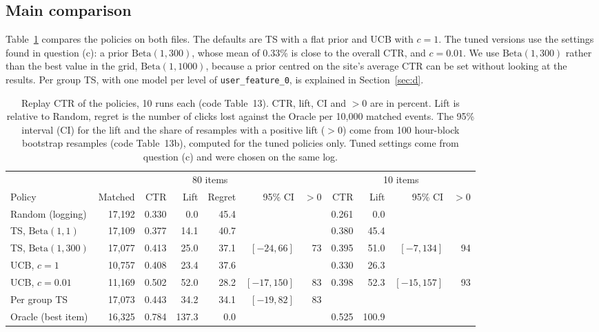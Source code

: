 \documentclass[11pt]{article}
\begin{document}
\subsection{Main comparison}

Table~\ref{tab:a} compares the policies on both files. The defaults are TS
with a flat prior and UCB with $c=1$. The tuned versions use the settings
found in question (c): a prior $\text{Beta}(1,300)$, whose mean of 0.33\% is
close to the overall CTR, and $c=0.01$. We use $\text{Beta}(1,300)$ rather
than the best value in the grid, $\text{Beta}(1,1000)$, because a prior
centred on the site's average CTR can be set without looking at the results.
Per group TS, with one model per level of \texttt{user\_feature\_0}, is
explained in Section~\ref{sec:d}.

\begin{table}[H]
  \centering
  \caption{Replay CTR of the policies, 10 runs each (code Table~13). CTR,
    lift, CI and $>0$ are in percent. Lift is
    relative to Random, regret is the number of clicks lost against the
    Oracle per 10{,}000 matched events. The 95\% interval (CI) for the lift
    and the share of resamples with a positive lift ($>0$) come from 100
    hour-block bootstrap resamples (code Table~13b), computed for the tuned
    policies only. Tuned settings come from question (c) and were chosen on
    the same log.}
  \label{tab:a}
  \footnotesize
  \setlength{\tabcolsep}{3pt}
  \begin{tabular}{lrrrrrr@{\hspace{10pt}}rrrr}
    \toprule
    & \multicolumn{6}{c}{80 items} & \multicolumn{4}{c}{10 items} \\
    \cmidrule(lr){2-7}\cmidrule(lr){8-11}
    Policy & Matched & CTR & Lift & Regret & 95\% CI & $>0$ & CTR & Lift & 95\% CI & $>0$ \\
    \midrule
    Random (logging)       & 17{,}192 & 0.330 &   0.0 & 45.4 &              &    & 0.261 &   0.0 &              &    \\
    TS, $\text{Beta}(1,1)$ & 17{,}109 & 0.377 &  14.1 & 40.7 &              &    & 0.380 &  45.4 &              &    \\
    TS, $\text{Beta}(1,300)$ & 17{,}077 & 0.413 & 25.0 & 37.1 & $[-24, 66]$  & 73 & 0.395 &  51.0 & $[-7, 134]$  & 94 \\
    UCB, $c=1$             & 10{,}757 & 0.408 &  23.4 & 37.6 &              &    & 0.330 &  26.3 &              &    \\
    UCB, $c=0.01$          & 11{,}169 & 0.502 &  52.0 & 28.2 & $[-17, 150]$ & 83 & 0.398 &  52.3 & $[-15, 157]$ & 93 \\
    Per group TS           & 17{,}073 & 0.443 &  34.2 & 34.1 & $[-19, 82]$  & 83 &       &       &              &    \\
    Oracle (best item)     & 16{,}325 & 0.784 & 137.3 &  0.0 &              &    & 0.525 & 100.9 &              &    \\
    \bottomrule
  \end{tabular}
\end{table}
\end{document}
